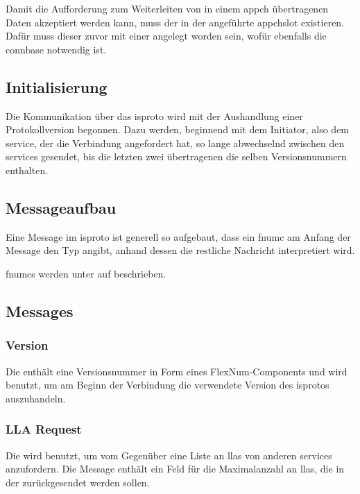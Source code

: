 Damit die Aufforderung zum Weiterleiten von in einem \gls{appch} übertragenen Daten akzeptiert
werden kann, muss der in der \msg{\isprotoacd} angeführte \gls{appchslot} existieren. Dafür
muss dieser zuvor mit einer \msg{\isprotoacsa} angelegt worden sein, wofür
ebenfalls die \gls{connbase}  notwendig ist.

\subsection{Initialisierung}
Die Kommunikation über das \gls{isproto} wird mit der Aushandlung einer Protokollversion begonnen.
Dazu werden, beginnend mit dem Initiator, also dem \gls{service}, der die Verbindung angefordert hat,
so lange \msgpl{\isprotoversion} abwechselnd zwischen den \glspl{service} gesendet, bis die letzten
zwei übertragenen \msgpl{\isprotoversion} die selben Versionsnummern enthalten.

\subsection{Messageaufbau}
Eine Message im \gls{isproto} ist generell so aufgebaut, dass ein \gls{fnumc} am Anfang der
Message den Typ angibt, anhand dessen die restliche Nachricht interpretiert wird.

\Glspl{fnumc} werden unter  auf
 beschrieben.

\isprotobytefield

\subsection{Messages}

\subsubsection{Version}
\label{dcl-isproto-version}
Die \msg{\isprotoversion} enthält eine Versionsnummer in Form eines FlexNum-Components und wird
benutzt, um am Beginn der Verbindung die verwendete Version des \gls{isproto}s auszuhandeln.

\isprotoversionbytefield

\subsubsection{LLA Request}
\label{dcl-isproto-llareq}
Die \msg{\isprotollareq} wird benutzt, um vom Gegenüber eine Liste an \glspl{lla} von anderen
\glspl{service} anzufordern.
Die Message enthält ein Feld für die Maximalanzahl an \glspl{lla}, die in der
\msg{\isprotollarep} zurückgesendet werden sollen.

